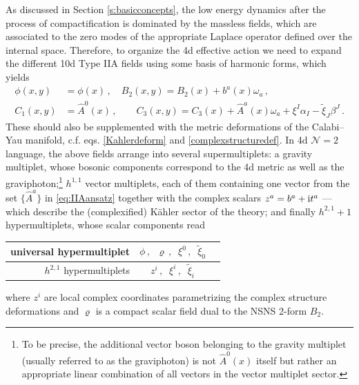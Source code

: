 As discussed in Section \ref{s:basicconcepts}, the low energy dynamics after the process of compactification is dominated by the massless fields, which are associated to the zero modes of the appropriate Laplace operator defined over the internal space. Therefore, to organize the 4d effective action we need to expand the different 10d Type IIA fields using some basis of harmonic forms, which yields \cite{Grimm:2005fa}
%
\begin{equation}\label{eq:IIAansatz}
\begin{aligned}
\phi(x,y)& =\phi(x)\, ,\quad B_2(x,y) = B_2(x) + b^a(x) \omega_a\, ,\\
C_1(x,y)&= \hat{A}^0(x)\, ,\qquad C_3(x,y)= C_3(x) + \hat{A}^a(x) \omega_a + \xi^I \alpha_I- \tilde{\xi}_J \beta^J \, .
\end{aligned}
\end{equation}
%
These should also be supplemented with the metric deformations of the Calabi--Yau manifold, c.f. eqs. \eqref{Kahlerdeform} and \eqref{complexstructuredef}. In 4d $\mathcal{N}=2$ language, the above fields arrange into several supermultiplets: a gravity multiplet, whose bosonic components correspond to the 4d metric as well as the graviphoton;\footnote{To be precise, the additional vector boson belonging to the gravity multiplet (usually referred to as the graviphoton) is not $\hat{A}^0(x)$ itself but rather an appropriate linear combination of all vectors in the vector multiplet sector\cite{Ceresole:1995ca}.} $h^{1,1}$ vector multiplets, each of them containing one vector from the set $\{ \hat{A}^a \}$ in \eqref{eq:IIAansatz} together with the complex scalars $z^a=b^a+{\rm i}t^a$ --- which describe the (complexified) K\"ahler sector of the theory; and finally $h^{2,1} + 1$ hypermultiplets, whose scalar components read 
%
\begin{center}
\renewcommand{\arraystretch}{2.00}
\begin{tabular}{r | c l}
universal hypermultiplet & $\phi\, ,\;\; \varrho\, ,\;\; \xi^0\, ,\;\; \tilde{\xi}_0$\\ 
\hline  
$h^{2,1}$ hypermultiplets & $z^i\, ,\;\; \xi^i\, ,\;\; \tilde{\xi}_i$\\
\end{tabular}\label{tab:4dhypers}
\end{center}  
%

where $z^i$ are local complex coordinates parametrizing the complex structure deformations and $\varrho$ is a compact scalar field dual to the NSNS 2-form $B_2$.

